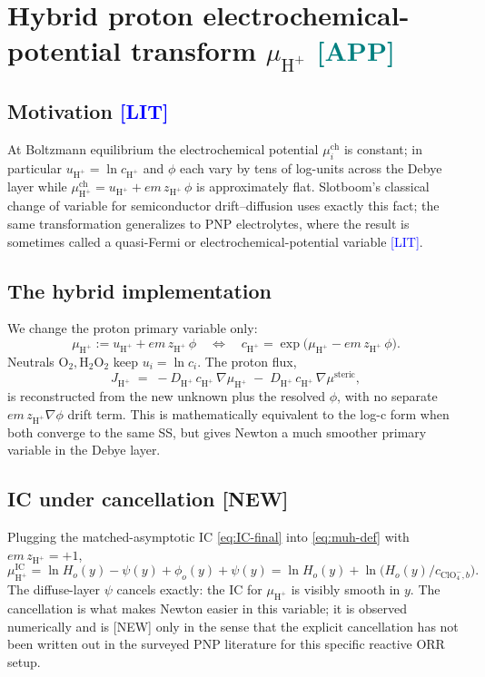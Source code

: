 \documentclass[11pt]{article}
\newcommand{\lit}{\textcolor{blue}{[LIT]}}
\newcommand{\app}{\textcolor{teal}{[APP]}}
\newcommand{\new}{\textcolor{red!70!black}{[NEW]}}
\newcommand{\ClO}{\text{ClO}_4^-}
\newcommand{\Hp}{\text{H}^+}
\newcommand{\Otwo}{\text{O}_2}
\newcommand{\Htwo}{\text{H}_2\text{O}_2}
\newcommand{\msteric}{\mu^{\mathrm{steric}}}
\newcommand{\mch}{\mu^{\mathrm{ch}}}
\begin{document}
\section{Hybrid proton electrochemical-potential transform $\mu_{\Hp}$ \app}
\label{sec:muh}

\subsection{Motivation \lit}
At Boltzmann equilibrium the electrochemical potential
$\mch_i$ is constant; in particular $u_{\Hp}=\ln c_{\Hp}$ and $\phi$
each vary by tens of log-units across the Debye layer while
\(\mch_{\Hp} = u_{\Hp} + em\,z_{\Hp}\,\phi\)
is approximately flat.  Slotboom's classical change of variable
\cite{slotboom1973} for semiconductor drift--diffusion uses exactly
this fact; the same transformation generalizes to PNP electrolytes,
where the result is sometimes called a quasi-Fermi or
electrochemical-potential variable \lit{}.

\subsection{The hybrid implementation}
We change the proton primary variable only:
\begin{equation}
  \mu_{\Hp} := u_{\Hp} + em\,z_{\Hp}\,\phi
        \quad\Longleftrightarrow\quad
  c_{\Hp} = \exp\!\bigl(\mu_{\Hp} - em\,z_{\Hp}\,\phi\bigr).
  \label{eq:muh-def}
\end{equation}
Neutrals $\Otwo, \Htwo$ keep $u_i = \ln c_i$.  The proton flux,
\begin{equation}
  J_{\Hp} \;=\; -D_{\Hp}\,c_{\Hp}\,\nabla\mu_{\Hp}
            \;-\; D_{\Hp}\,c_{\Hp}\,\nabla\msteric,
\end{equation}
is reconstructed from the new unknown plus the resolved $\phi$, with
no separate $em\,z_{\Hp}\nabla\phi$ drift term.  This is mathematically
equivalent to the log-c form when both converge to the same SS, but
gives Newton a much smoother primary variable in the Debye layer.

\subsection{IC under cancellation \new}
Plugging the matched-asymptotic IC \eqref{eq:IC-final} into
\eqref{eq:muh-def} with $em\,z_{\Hp}=+1$,
\begin{equation}
  \mu_{\Hp}^{\mathrm{IC}}
   = \ln H_o(y) - \psi(y) + \phi_o(y) + \psi(y)
   = \ln H_o(y) + \ln\!\bigl(H_o(y)/c_{\ClO,b}\bigr).
\end{equation}
The diffuse-layer $\psi$ cancels exactly: the IC for $\mu_{\Hp}$ is
visibly smooth in $y$.  The cancellation is what makes Newton easier
in this variable; it is observed numerically and is \new{} only in
the sense that the explicit cancellation has not been written out
in the surveyed PNP literature for this specific reactive ORR setup.
\end{document}
